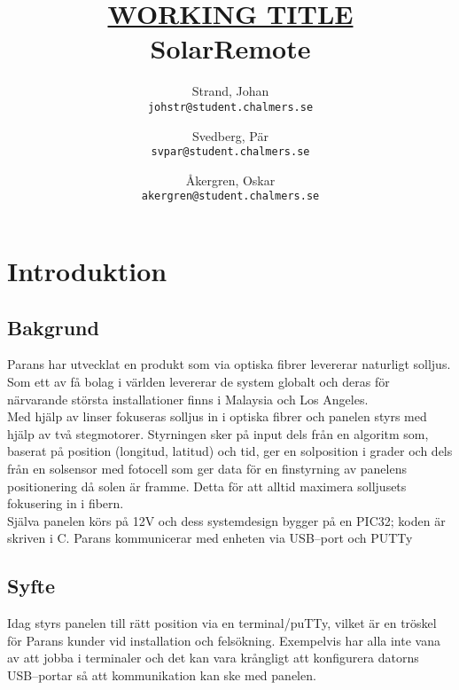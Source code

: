 \documentclass{article}
\author{    Strand, Johan \\ \texttt{johstr@student.chalmers.se} \and
            Svedberg, Pär\\ \texttt{svpar@student.chalmers.se} \and
            Åkergren, Oskar\\ \texttt{akergren@student.chalmers.se}
}
\title{\underline{\small{WORKING TITLE}} \\ SolarRemote}
\begin{document}
    \maketitle
    \thispagestyle{empty}

    \newpage 

    \tableofcontents

    \newpage

    \section{Introduktion} %
    \label{sec:introduktion}

        \subsection{Bakgrund} %
        \label{sub:bakgrund}
            Parans har utvecklat en produkt som via optiska fibrer levererar naturligt solljus. Som ett av få bolag i världen levererar de system globalt och deras för närvarande största installationer finns i Malaysia och Los Angeles.\\

            \noindent Med hjälp av linser fokuseras solljus in i optiska fibrer och panelen styrs med hjälp av två stegmotorer. Styrningen sker på input dels från en algoritm som, baserat på position (longitud, latitud) och tid, ger en solposition i grader och dels från en solsensor med fotocell som ger data för en finstyrning av panelens positionering då solen är framme. Detta för att alltid maximera solljusets fokusering in i fibern.\\

            \noindent Själva panelen körs på 12V och dess systemdesign bygger på en PIC32; koden är skriven i C. Parans kommunicerar med enheten via USB--port och PUTTy
        
        \subsection{Syfte} %
        \label{sub:syfte}
            Idag styrs panelen till rätt position via en terminal/puTTy, vilket är en tröskel för Parans kunder vid installation och felsökning.  Exempelvis har alla inte vana av att jobba i terminaler och det kan vara krångligt att konfigurera datorns USB--portar så att kommunikation kan ske med panelen. \\
\end{document}
